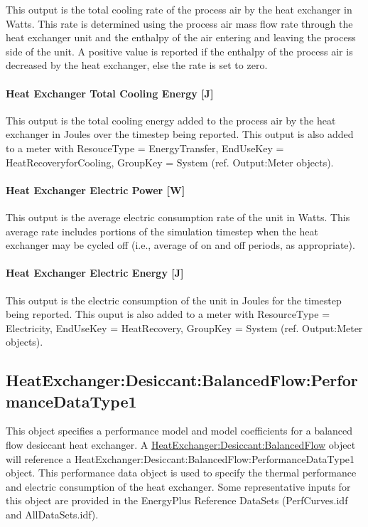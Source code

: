 This output is the total cooling rate of the process air by the heat exchanger in Watts. This rate is determined using the process air mass flow rate through the heat exchanger unit and the enthalpy of the air entering and leaving the process side of the unit. A positive value is reported if the enthalpy of the process air is decreased by the heat exchanger, else the rate is set to zero.

\paragraph{Heat Exchanger Total Cooling Energy {[}J{]}}\label{heat-exchanger-total-cooling-energy-j-2}

This output is the total cooling energy added to the process air by the heat exchanger in Joules over the timestep being reported. This output is also added to a meter with ResouceType = EnergyTransfer, EndUseKey = HeatRecoveryforCooling, GroupKey = System (ref. Output:Meter objects).

\paragraph{Heat Exchanger Electric Power {[}W{]}}\label{heat-exchanger-electric-power-w-2}

This output is the average electric consumption rate of the unit in Watts. This average rate includes portions of the simulation timestep when the heat exchanger may be cycled off (i.e., average of on and off periods, as appropriate).

\paragraph{Heat Exchanger Electric Energy {[}J{]}}\label{heat-exchanger-electric-energy-j-2}

This output is the electric consumption of the unit in Joules for the timestep being reported. This ouput is also added to a meter with ResourceType = Electricity, EndUseKey = HeatRecovery, GroupKey = System (ref. Output:Meter objects).

\subsection{HeatExchanger:Desiccant:BalancedFlow:PerformanceDataType1}\label{heatexchangerdesiccantbalancedflowperformancedatatype1}

This object specifies a performance model and model coefficients for a balanced flow desiccant heat exchanger. A \hyperref[heatexchangerdesiccantbalancedflow]{HeatExchanger:Desiccant:BalancedFlow} object will reference a HeatExchanger:Desiccant:BalancedFlow:PerformanceDataType1 object. This performance data object is used to specify the thermal performance and electric consumption of the heat exchanger. Some representative inputs for this object are provided in the EnergyPlus Reference DataSets (PerfCurves.idf and AllDataSets.idf).

